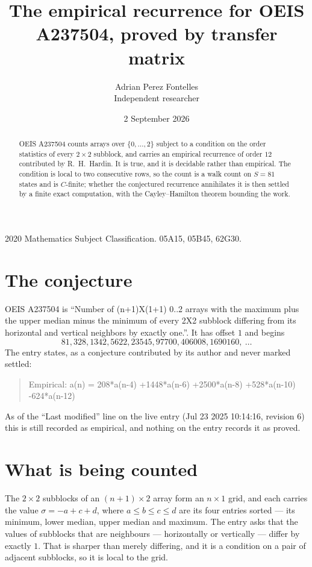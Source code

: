 \documentclass[11pt,a4paper]{article}
\title{The empirical recurrence for OEIS A237504, proved by transfer matrix}
\author{Adrian Perez Fontelles\\ \small Independent researcher}
\date{2 September 2026}
\theoremstyle{plain}
\theoremstyle{definition}
\begin{document}
\maketitle

\begin{abstract}
OEIS A237504 counts arrays over $\{0,\dots,2\}$ subject to a condition on the order
statistics of every $2\times2$ subblock, and carries an empirical recurrence of order
$12$ contributed by R.~H.~Hardin. It is true, and it is decidable rather than empirical.
The condition is local to two consecutive rows, so the count is a walk count on $S=81$
states and is $C$-finite; whether the conjectured recurrence annihilates it is then settled by
a finite exact computation, with the Cayley--Hamilton theorem bounding the work.
\end{abstract}

\noindent\small 2020 Mathematics Subject Classification. 05A15, 05B45, 62G30.\normalsize

\section{The conjecture}

OEIS A237504 is ``Number of (n+1)X(1+1) 0..2 arrays with the maximum plus the upper median minus the minimum of every 2X2 subblock differing from its horizontal and vertical neighbors by exactly one.''. It has offset $1$ and begins
\[
81, 328, 1342, 5622, 23545, 97700, 406008, 1690160,\ \dots
\]
The entry states, as a conjecture contributed by its author and never marked settled:
\begin{quote}
Empirical: a(n) = 208*a(n-4) +1448*a(n-6) +2500*a(n-8) +528*a(n-10) -624*a(n-12)
\end{quote}
As of the ``Last modified'' line on the live entry (Jul 23 2025 10:14:16, revision 6) this is still
recorded as empirical, and nothing on the entry records it as proved.

\section{What is being counted}

The $2\times2$ subblocks of an $(n+1)\times2$ array form an
$n\times1$ grid, and each carries the value $\sigma=-a+c+d$, where $a\le b\le c\le d$ are its four entries sorted --- its minimum, lower median, upper median and maximum. The entry asks that the values of
subblocks that are neighbours --- horizontally or vertically --- differ by exactly $1$.
That is sharper than merely differing, and it is a condition on a pair of adjacent subblocks,
so it is local to the grid.
\end{document}
